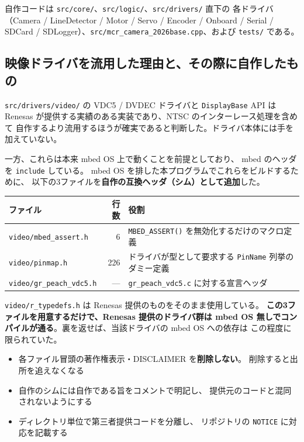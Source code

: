 \documentclass[a4paper,11pt,dvipdfmx]{jsarticle}
\begin{document}
\vspace{2mm}
自作コードは \texttt{src/core/}、\texttt{src/logic/}、\texttt{src/drivers/} 直下の
各ドライバ（Camera / LineDetector / Motor / Servo / Encoder / Onboard / Serial /
SDCard / SDLogger）、\texttt{src/mcr\_camera\_2026base.cpp}、および
\texttt{tests/} である。

\subsection{映像ドライバを流用した理由と、その際に自作したもの}

\texttt{src/drivers/video/} の VDC5 / DVDEC ドライバと \texttt{DisplayBase} API は
Renesas が提供する実績のある実装であり、NTSC のインターレース処理を含めて
自作するより流用するほうが確実であると判断した。ドライバ本体には手を加えていない。

一方、これらは本来 mbed OS 上で動くことを前提としており、
mbed のヘッダを \texttt{include} している。
mbed OS を排した本プログラムでこれらをビルドするために、
以下の3ファイルを\textbf{自作の互換ヘッダ（シム）として追加}した。

\begin{tabularx}{\textwidth}{l r X}
\toprule
\textbf{ファイル} & \textbf{行数} & \textbf{役割} \\
\midrule
\texttt{video/mbed\_assert.h} & 6 & \texttt{MBED\_ASSERT()} を無効化するだけのマクロ定義 \\
\texttt{video/pinmap.h} & 226 & ドライバが型として要求する \texttt{PinName} 列挙のダミー定義 \\
\texttt{video/gr\_peach\_vdc5.h} & --- & \texttt{gr\_peach\_vdc5.c} に対する宣言ヘッダ \\
\bottomrule
\end{tabularx}

\vspace{2mm}
\texttt{video/r\_typedefs.h} は Renesas 提供のものをそのまま使用している。
\textbf{この3ファイルを用意するだけで、Renesas 提供のドライバ群は
mbed OS 無しでコンパイルが通る}。裏を返せば、当該ドライバの mbed OS への依存は
この程度に限られていた。

\begin{cautionbox}[第三者提供コードを扱うときの原則]
\begin{itemize}[nosep]
  \item 各ファイル冒頭の著作権表示・DISCLAIMER を\textbf{削除しない}。
        削除すると出所を追えなくなる
  \item 自作のシムには自作である旨をコメントで明記し、
        提供元のコードと混同されないようにする
  \item ディレクトリ単位で第三者提供コードを分離し、
        リポジトリの \texttt{NOTICE} に対応を記載する
\end{itemize}
\end{cautionbox}
\end{document}
